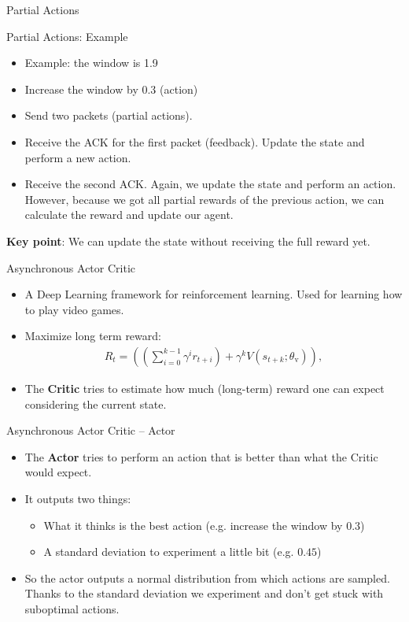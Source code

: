 \documentclass[11pt]{beamer}
\begin{document}
\begin{frame}{Partial Actions}
\centering

\end{frame}

\begin{frame}{Partial Actions: Example}
\begin{itemize}
\item Example: the window is 1.9
\item Increase the window by $0.3$ (action)
\item Send two packets (partial actions).  
\item Receive the ACK for the first packet (feedback). Update the state and perform a new action.
\item Receive the second ACK. Again, we update the state and perform an action. However, because we got all partial rewards of the previous action, we can calculate the reward and update our agent.
\end{itemize}
\textbf{Key point}: We can update the state without receiving the full reward yet.
\end{frame}

\begin{frame}{Asynchronous Actor Critic}
\begin{itemize}
\item A Deep Learning framework for reinforcement learning. Used for learning how to play video games.
\item Maximize long term reward: \begin{align*}
R_t = \left(\left(\sum_{i=0}^{k-1} \gamma^ir_{t+i}\right) + \gamma^k V(s_{t+k}; \theta_\text{v})\right),
\end{align*}
\item The \textbf{Critic} tries to estimate how much (long-term) reward one can expect considering the current state.
\end{itemize}
\end{frame}

\begin{frame}{Asynchronous Actor Critic -- Actor}
\begin{itemize}
\item The \textbf{Actor} tries to perform an action that is better than what the Critic would expect.
\item It outputs two things:
\begin{itemize}
\item What it thinks is the best action (e.g. increase the window by $0.3$)
\item A standard deviation to experiment a little bit (e.g. $0.45$)
\end{itemize}
\item So the actor outputs a normal distribution from which actions are sampled. Thanks to the standard deviation we experiment and don't get stuck with suboptimal actions. 
\end{itemize}
\end{frame}
\end{document}
